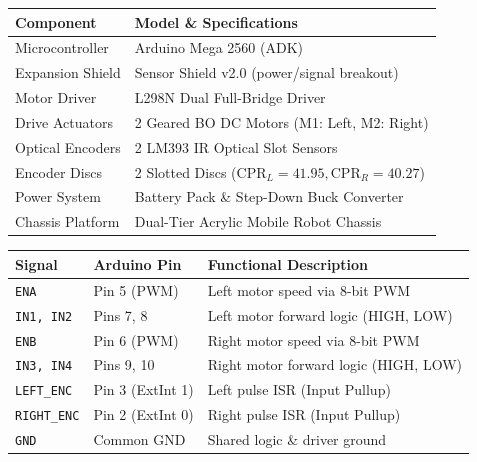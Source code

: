 \documentclass[11pt,a4paper]{article}
\begin{document}
\vspace{0.10cm}
\noindent
\begin{minipage}[t]{0.50\textwidth}
\centering
\scriptsize
\renewcommand{\arraystretch}{0.76}
\begin{tabularx}{\textwidth}{@{}lX@{}}
\toprule
\textbf{Component} & \textbf{Model \& Specifications} \\
\midrule
Microcontroller & Arduino Mega 2560 (ADK) \\
Expansion Shield & Sensor Shield v2.0 (power/signal breakout) \\
Motor Driver & L298N Dual Full-Bridge Driver \\
Drive Actuators & 2 Geared BO DC Motors (M1: Left, M2: Right) \\
Optical Encoders & 2 LM393 IR Optical Slot Sensors \\
Encoder Discs & 2 Slotted Discs ($\text{CPR}_L = 41.95, \text{CPR}_R = 40.27$) \\
Power System & Battery Pack \& Step-Down Buck Converter \\
Chassis Platform & Dual-Tier Acrylic Mobile Robot Chassis \\
\bottomrule
\end{tabularx}
\label{tab_components}
\end{minipage}
\hfill
\begin{minipage}[t]{0.47\textwidth}
\centering
\scriptsize
\renewcommand{\arraystretch}{0.76}
\begin{tabularx}{\textwidth}{@{}llX@{}}
\toprule
\textbf{Signal} & \textbf{Arduino Pin} & \textbf{Functional Description} \\
\midrule
\texttt{ENA} & Pin 5 (PWM) & Left motor speed via 8-bit PWM \\
\texttt{IN1, IN2} & Pins 7, 8 & Left motor forward logic (HIGH, LOW) \\
\texttt{ENB} & Pin 6 (PWM) & Right motor speed via 8-bit PWM \\
\texttt{IN3, IN4} & Pins 9, 10 & Right motor forward logic (HIGH, LOW) \\
\texttt{LEFT\_ENC} & Pin 3 (ExtInt 1) & Left pulse ISR (Input Pullup) \\
\texttt{RIGHT\_ENC} & Pin 2 (ExtInt 0) & Right pulse ISR (Input Pullup) \\
\texttt{GND} & Common GND & Shared logic \& driver ground \\
\bottomrule
\end{tabularx}
\label{tab_pins}
\end{minipage}
\end{document}
